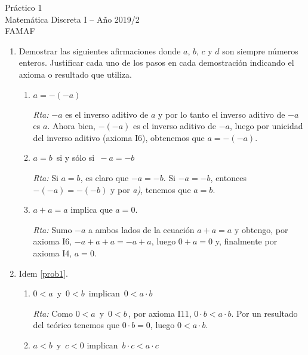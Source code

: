 \documentclass[12pt,spanish,makeidx]{amsbook}
\newcommand{\rta}{\noindent\textit{Rta: }}
\begin{document}
	
	
	
	{\bf \begin{center} Práctico 1 \\ Matemática Discreta I -- Año 2019/2 \\ FAMAF \end{center}}
	
	\smallskip
	
	\begin{enumerate}
		
		
		\item\label{prob1} Demostrar las siguientes afirmaciones donde $a$, $b$, $c$ y $d$ son siempre números enteros. Justificar cada uno de los pasos en cada demostración indicando el axioma o resultado que utiliza.
		\begin{enumerate}
			\item  $a=-(-a)$
			
			\rta $-a$  es el inverso aditivo de $a$ y por lo tanto el inverso aditivo de $-a$ es $a$.  Ahora bien, $-(-a)$  es el inverso aditivo de  $-a$, luego por  unicidad del inverso aditivo (axioma { I6}), obtenemos que $a = -(-a)$.
			
			\item  $a=b\,$ si y sólo si $\,-a=-b$
			
			\rta Si  $a=b$, es claro que $-a=-b$. Si $-a= -b$, entonces $-(-a) = -(-b)$ y  por \textit{a)}, tenemos que $a=b$.  
			
			\item  $a+a=a$ implica que  $a=0$.
			
			\rta Sumo $-a$ a ambos lados de la ecuación  $a+a=a$ y obtengo, por axioma I6,  $-a + a + a = -a +a$, luego $0 +a = 0$ y, finalmente por axioma I4, $a=0$. 
			
		\end{enumerate}
		
		
		\medskip
		
		\item Idem \ref{prob1}.
		
		\begin{enumerate}
			\item $0<a\,$ y $\,0<b\,$ implican $\,0<a\cdot b$
			
			\rta Como $0<a\,$ y $\,0<b\,$, por axioma I11, $0 \cdot b < a \cdot b$. Por un resultado del teórico  tenemos que $0 \cdot b = 0$, luego $0 < a\cdot b$.
			
			\item $a<b\,$ y $\,c<0$ implican $\,b\cdot c<a\cdot c$
			

\end{enumerate}
\end{enumerate}
\end{document}
